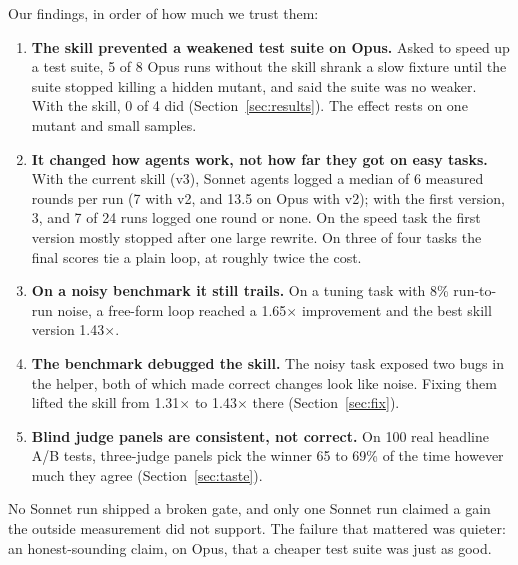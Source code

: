 Our findings, in order of how much we trust them:
\begin{enumerate}
\item \textbf{The skill prevented a weakened test suite on Opus.} Asked to speed up a test suite, 5 of 8 Opus runs
  without the skill shrank a slow fixture until the suite stopped killing a hidden mutant, and said the suite was no
  weaker. With the skill, 0 of 4 did (Section~\ref{sec:results}). The effect rests on one mutant and small samples.
\item \textbf{It changed how agents work, not how far they got on easy tasks.} With the current skill (v3), Sonnet agents
  logged a median of 6 measured rounds per run (7 with v2, and 13.5 on Opus with v2); with the first version, 3, and 7 of 24 runs logged
  one round or none. On the speed task the first version mostly stopped after one large rewrite. On three
  of four tasks the final scores tie a plain loop, at roughly twice the cost.
\item \textbf{On a noisy benchmark it still trails.} On a tuning task with 8\% run-to-run noise, a free-form loop
  reached a 1.65$\times$ improvement and the best skill version 1.43$\times$.
\item \textbf{The benchmark debugged the skill.} The noisy task exposed two bugs in the helper, both of which made
  correct changes look like noise. Fixing them lifted the skill from 1.31$\times$ to 1.43$\times$ there
  (Section~\ref{sec:fix}).
\item \textbf{Blind judge panels are consistent, not correct.} On 100 real headline A/B tests, three-judge panels
  pick the winner 65 to 69\% of the time however much they agree (Section~\ref{sec:taste}).
\end{enumerate}

No Sonnet run shipped a broken gate, and only one Sonnet run claimed a gain the outside measurement did not
support. The failure that mattered was quieter: an honest-sounding claim, on Opus, that a cheaper test suite was
just as good.
